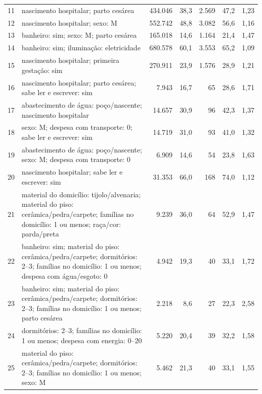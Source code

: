 \begin{table}[H]
\begin{tabularx}{\textwidth}{@{}c Y r r r r r@{}}
11 & nascimento hospitalar; parto cesárea & 434.046 & 38,3 & 2.569 & 47,2 & 1,23 \\
12 & nascimento hospitalar; sexo: M & 552.742 & 48,8 & 3.082 & 56,6 & 1,16 \\
13 & banheiro: sim; sexo: M; parto cesárea & 165.018 & 14,6 & 1.164 & 21,4 & 1,47 \\
14 & banheiro: sim; iluminação: eletricidade & 680.578 & 60,1 & 3.553 & 65,2 & 1,09 \\
15 & nascimento hospitalar; primeira gestação: sim & 270.911 & 23,9 & 1.576 & 28,9 & 1,21 \\

16 & nascimento hospitalar; parto cesárea; sabe ler e escrever: sim & 7.943 & 16,7 & 65 & 28,6 & 1,71 \\
17 & abastecimento de água: poço/nascente; nascimento hospitalar & 14.657 & 30,9 & 96 & 42,3 & 1,37 \\
18 & sexo: M; despesa com transporte: 0; sabe ler e escrever: sim & 14.719 & 31,0 & 93 & 41,0 & 1,32 \\
19 & abastecimento de água: poço/nascente; sexo: M; despesa com transporte: 0 & 6.909 & 14,6 & 54 & 23,8 & 1,63 \\
20 & nascimento hospitalar; sabe ler e escrever: sim & 31.353 & 66,0 & 168 & 74,0 & 1,12 \\

21 & material do domicílio: tijolo/alvenaria; material do piso: cerâmica/pedra/carpete; famílias no domicílio: 1 ou menos; raça/cor: parda/preta & 9.239 & 36,0 & 64 & 52,9 & 1,47 \\
22 & banheiro: sim; material do piso: cerâmica/pedra/carpete; dormitórios: 2--3; famílias no domicílio: 1 ou menos; despesa com água/esgoto: 0 & 4.942 & 19,3 & 40 & 33,1 & 1,72 \\
23 & banheiro: sim; material do piso: cerâmica/pedra/carpete; dormitórios: 2--3; famílias no domicílio: 1 ou menos; parto cesárea & 2.218 & 8,6 & 27 & 22,3 & 2,58 \\
24 & dormitórios: 2--3; famílias no domicílio: 1 ou menos; despesa com energia: 0--20 & 5.220 & 20,4 & 39 & 32,2 & 1,58 \\
25 & material do piso: cerâmica/pedra/carpete; dormitórios: 2--3; famílias no domicílio: 1 ou menos; sexo: M & 5.462 & 21,3 & 40 & 33,1 & 1,55 \\


\end{tabularx}
\end{table}
